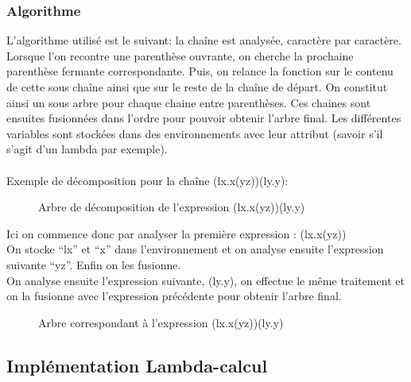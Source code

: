 \documentclass[a4paper,11pt,titlepage]{article}
\begin{document}
\subsubsection{Algorithme}
L'algorithme utilisé est le suivant: la chaîne est analysée, caractère par caractère. Lorsque l'on recontre une parenthèse ouvrante, on cherche la prochaine parenthèse fermante correspondante. Puis, on relance la fonction sur le contenu de cette sous chaîne ainsi que sur le reste de la chaîne de départ. On constitut ainsi un sous arbre pour chaque chaine entre parenthèses. Ces chaines sont ensuites fusionnées dans l'ordre pour pouvoir obtenir l'arbre final.
Les différentes variables sont stockées dans des environnements avec leur attribut (savoir s'il s'agit d'un lambda par exemple).
\\
\\Exemple de décomposition pour la chaîne (lx.x(yz))(ly.y):
\begin{figure}[H]
\centering
  {
	 {{
			  {
			   {}
			   {}
			  }
		 
	 }
	{}
	}
  }
\caption{Arbre de décomposition de l'expression (lx.x(yz))(ly.y)}
 \label{tree2}
\end{figure}

Ici on commence donc par analyser la première expression : (lx.x(yz))\\
On stocke ``lx'' et ``x'' dans l'environnement et on analyse ensuite l'expression suivante ``yz''. Enfin on les fusionne.\\

On analyse ensuite l'expression suivante, (ly.y), on effectue le même traitement et on la fusionne avec l'expression précédente pour obtenir l'arbre final.
\begin{figure}[H]
\centering
  {
	 {{
		 {
			  {
			   {}
			   {
			      {{}
			       {}}
			   }
			  }
		 }
	 }
	{
		{}


	}}
  }
\caption{Arbre correspondant à l'expression (lx.x(yz))(ly.y)}
 \label{tree3}
\end{figure}

\subsection{Implémentation Lambda-calcul}
\end{document}
